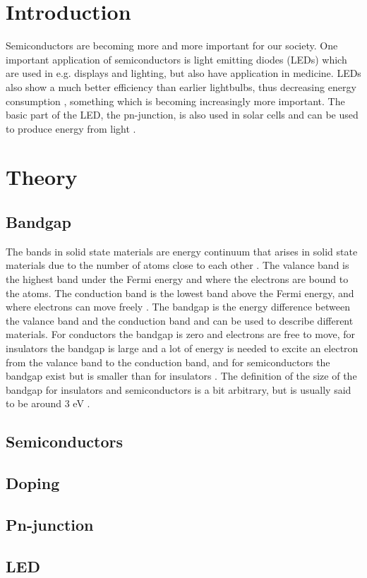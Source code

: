 \section{Introduction}
Semiconductors are becoming more and more important for our society. One important application of semiconductors is light emitting diodes (LEDs) \cite{hofmann2015} which are used in e.g. displays and lighting, but also have application in medicine. LEDs also show a much better efficiency than earlier lightbulbs, thus decreasing energy consumption \cite{hofmann2015}, something which is becoming increasingly more important. The basic part of the LED, the pn-junction, is also used in solar cells and can be used to produce energy from light \cite{hofmann2015}.

\section{Theory}
\subsection{Bandgap}
The bands in solid state materials are energy continuum that arises in solid state materials due to the number of atoms close to each other \cite{hofmann2015}. The valance band is the highest band under the Fermi energy and where the electrons are bound to the atoms. The conduction band is the lowest band above the Fermi energy, and where electrons can move freely \cite{hofmann2015}. The bandgap is the energy difference between the valance band and the conduction band and can be used to describe different materials. For conductors the bandgap is zero and electrons are free to move, for insulators the bandgap is large and a lot of energy is needed to excite an electron from the valance band to the conduction band, and for semiconductors the bandgap exist but is smaller than for insulators \cite{hofmann2015}. The definition of the size of the bandgap for insulators and semiconductors is a bit arbitrary, but is usually said to be around 3 eV \cite{hofmann2015}.

\subsection{Semiconductors}

\subsection{Doping}

\subsection{Pn-junction}

\subsection{LED}